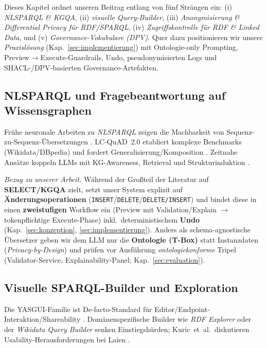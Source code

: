 Dieses Kapitel ordnet unseren Beitrag entlang von fünf Strängen ein: (i) \emph{NL{\textrightarrow}SPARQL \& KGQA}, (ii) \emph{visuelle Query-Builder}, (iii) \emph{Anonymisierung \& Differential Privacy für RDF/SPARQL}, (iv) \emph{Zugriffskontrolle für RDF \& Linked Data}, und (v) \emph{Governance-Vokabulare (DPV)}. Quer dazu positionieren wir unsere \emph{Praxislösung} (Kap.~\ref{sec:implementierung}) mit Ontologie-only Prompting, Preview{\(\rightarrow\)}Execute-Guardrails, Undo, pseudonymisierten Logs und SHACL-/DPV-basierten Governance-Artefakten.

\subsection{NL{\textrightarrow}SPARQL und Fragebeantwortung auf Wissensgraphen}
Frühe neuronale Arbeiten zu \emph{NL{\textrightarrow}SPARQL} zeigen die Machbarkeit von Sequenz-zu-Sequenz-Übersetzungen \cite{yin-nmt-sparql}. LC-QuAD~2.0 etabliert komplexe Benchmarks (Wikidata/DBpedia) und fordert Generalisierung/Komposition \cite{lcquad2}. Zeitnahe Ansätze koppeln LLMs mit KG-Awareness, Retrieval und Strukturinduktion \cite{avila-kgqa-llm,pramanik-uniqorn}.

\textit{Bezug zu unserer Arbeit.} Während der Großteil der Literatur auf \textbf{SELECT/KGQA} zielt, setzt unser System explizit auf \textbf{Änderungsoperationen} (\texttt{INSERT}/\texttt{DELETE}/\texttt{DELETE/INSERT}) und bindet diese in einen \textbf{zweistufigen} Workflow ein (Preview mit Validation/Explain {\(\rightarrow\)} tokenpflichtige Execute-Phase) inkl.\ deterministischem \textbf{Undo} (Kap.~\ref{sec:konzeption}, \ref{sec:implementierung}). Anders als schema-agnostische Übersetzer geben wir dem LLM nur die \textbf{Ontologie (T-Box)} statt Instanzdaten (\emph{Privacy-by-Design}) und prüfen vor Ausführung \emph{ontologiekonforme} Tripel (Validator-Service, Explainability-Panel; Kap.~\ref{sec:evaluation}).

\subsection{Visuelle SPARQL-Builder und Exploration}
Die YASGUI-Familie ist De-facto-Standard für Editor/Endpoint-Interaktion/Shareability \cite{yasgui}. Domänenspezifische Builder wie \emph{RDF Explorer} \cite{vargas-rdf-explorer} oder der \emph{Wikidata Query Builder} senken Einstiegshürden; Kuric~et~al.\ diskutieren Usability-Herausforderungen bei Laien \cite{kuric-usability}.

